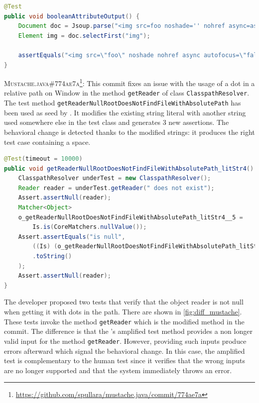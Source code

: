 \begin{lstlisting}[float,language=java,caption=Provided test by the developer for \textsc{3676b13} of Jsoup.,label=fig:diff_jsoup]
@Test
public void booleanAttributeOutput() {
	Document doc = Jsoup.parse("<img src=foo noshade='' nohref async=async autofocus=false>");
	Element img = doc.selectFirst("img");

	assertEquals("<img src=\"foo\" noshade nohref async autofocus=\"false\">", img.outerHtml());
}
\end{lstlisting}

\textsc{Mustache.java\#774ae7a}\footnote{\url{https://github.com/spullara/mustache.java/commit/774ae7a}}: This commit fixes an issue with the usage of a dot in a relative path on Window in the method \texttt{getReader} of class \texttt{ClasspathResolver}.
The test method \texttt{getReaderNullRootDoesNotFindFileWithAbsolutePath} has been used as seed by \DCI.
It modifies the existing string literal with another string used somewhere else in the test class and generates 3 new assertions.
The behavioral change is detected thanks to the modified strings: it produces the right test case containing a space.

\begin{lstlisting}[float,language=java,caption=Test generated by \DCII that detects the behavioral change of \textsc{774ae7a} of Mustache.java.,label=fig:ampl_mustache]
@Test(timeout = 10000)
public void getReaderNullRootDoesNotFindFileWithAbsolutePath_litStr4() {
	ClasspathResolver underTest = new ClasspathResolver();
	Reader reader = underTest.getReader(" does not exist");
	Assert.assertNull(reader);
	Matcher<Object> 
	o_getReaderNullRootDoesNotFindFileWithAbsolutePath_litStr4__5 =
		Is.is(CoreMatchers.nullValue());
	Assert.assertEquals("is null", 
		((Is) (o_getReaderNullRootDoesNotFindFileWithAbsolutePath_litStr4__5))
		.toString()
	);
	Assert.assertNull(reader);
}
\end{lstlisting}

The developer proposed two tests that verify that the object reader is not null when getting it with dots in the path.
There are shown in \autoref{fig:diff_mustache}.
These tests invoke the method \texttt{getReader} which is the modified method in the commit.
%
The difference is that the \DCII's amplified test method provides a non longer valid input for the method \texttt{getReader}.
However, providing such inputs produce errors afterward which signal the behavioral change.
In this case, the amplified test is complementary to the human test since it verifies that the wrong inputs are no longer supported and that the system immediately throws an error.

